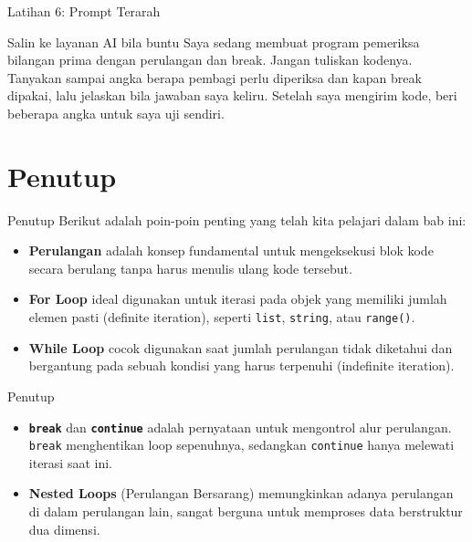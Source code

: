 \documentclass[aspectratio=169, table]{beamer}
\begin{document}
\begin{frame}{Latihan 6: Prompt Terarah}
\begin{block}{Salin ke layanan AI bila buntu}
\small Saya sedang membuat program pemeriksa bilangan prima dengan perulangan dan break. Jangan tuliskan kodenya. Tanyakan sampai angka berapa pembagi perlu diperiksa dan kapan break dipakai, lalu jelaskan bila jawaban saya keliru. Setelah saya mengirim kode, beri beberapa angka untuk saya uji sendiri.
\end{block}
\end{frame}

\section{Penutup}
\begin{frame}{Penutup}
    Berikut adalah poin-poin penting yang telah kita pelajari dalam bab ini:
    \begin{itemize}
        \item \textbf{Perulangan} adalah konsep fundamental untuk mengeksekusi blok kode secara berulang tanpa harus menulis ulang kode tersebut.
        \vspace{10pt}
        \item \textbf{For Loop} ideal digunakan untuk iterasi pada objek yang memiliki jumlah elemen pasti (definite iteration), seperti \texttt{list}, \texttt{string}, atau \texttt{range()}.
        \vspace{10pt}
        \item \textbf{While Loop} cocok digunakan saat jumlah perulangan tidak diketahui dan bergantung pada sebuah kondisi yang harus terpenuhi (indefinite iteration).
    \end{itemize}
\end{frame}

\begin{frame}{Penutup}
    \begin{itemize}
        \item \textbf{\texttt{break}} dan \textbf{\texttt{continue}} adalah pernyataan untuk mengontrol alur perulangan. \texttt{break} menghentikan loop sepenuhnya, sedangkan \texttt{continue} hanya melewati iterasi saat ini.
        \vspace{10pt}
        \item \textbf{Nested Loops} (Perulangan Bersarang) memungkinkan adanya perulangan di dalam perulangan lain, sangat berguna untuk memproses data berstruktur dua dimensi.
    \end{itemize}
\end{frame}
\end{document}
